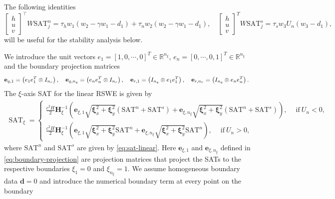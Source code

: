 \documentclass{article}
\numberwithin{equation}{section}
\theoremstyle{definition}
\begin{document}
The following identities 
$$
\begin{bmatrix}
    h\\
    u\\
    v
\end{bmatrix}^\top W\mathrm{SAT}^{n}_{j} 
= 
\tau_h w_1 \left(w_2 - \gamma w_1- d_1\right) +
     \tau_n w_2\left(w_2 - \gamma w_1- d_1\right),
     \quad
\begin{bmatrix}
    h\\
    u\\
    v
\end{bmatrix}^T W\mathrm{SAT}^{s}_{j} 
= 
\tau_s w_3 U_n \left(w_3- d_1\right) ,
$$
will be useful for the stability analysis below. 

We introduce the unit vectors
$e_1 = [1, 0, \cdots, 0]^T\in \mathbb{R}^{n_\xi}$, $e_{n} = [0,  \cdots, 0, 1]^T\in \mathbb{R}^{n_\xi}$
and the boundary projection matrices
\begin{align}\label{eq:boundary-projection}
\centering
&\mathbf{e}_{q, 1} = \left( e_1 e_1^T \otimes I_{n_r}\right), \quad \mathbf{e}_{q, n_q} = \left( e_n e_n^T \otimes I_{n_r}\right), \quad \mathbf{e}_{r, 1} = \left(I_{n_q} \otimes  e_1 e_1^T\right), \quad
\mathbf{e}_{r, n_r} = \left(I_{n_q} \otimes  e_n e_n^T\right).
\end{align}
The $\xi$-axis SAT for the linear RSWE is given by
{\footnotesize
\begin{eqnarray}\label{eq:sat-axis-linear}
\operatorname{SAT}_\xi=
 \begin{cases}
    \frac{c^2H}{2}\bm{H}_{\xi}^{-1}\left(\mathbf{e}_{\xi, 1}\sqrt{\bm{\xi}_x^2 + \bm{\xi}_y^2}\left(\mathrm{SAT}^{n} + \mathrm{SAT}^{s}\right) + \mathbf{e}_{\xi, n_\xi}\sqrt{\bm{\xi}_x^2 + \bm{\xi}_y^2}\left(\mathrm{SAT}^{n} + \mathrm{SAT}^{s}\right)\right), \quad \ \text{if} \ U_n < 0, \\
   \frac{c^2H}{2}\bm{H}_{\xi}^{-1}\left(\mathbf{e}_{\xi,1}\sqrt{\bm{\xi}_x^2 + \bm{\xi}_y^2}\mathrm{SAT}^{n} + \mathbf{e}_{\xi,n_\xi}\sqrt{\bm{\xi}_x^2 + \bm{\xi}_y^2}\mathrm{SAT}^{n}\right), \quad \ \text{if} \ U_n > 0,
    \end{cases}
\end{eqnarray}
}
where $\mathrm{SAT}^{n}$ and $\mathrm{SAT}^{s}$ are given by \eqref{eq:sat-linear}.
Here $\mathbf{e}_{\xi,1}$ and  $\mathbf{e}_{\xi,n_\xi}$ defined in \eqref{eq:boundary-projection} are projection matrices that project the SATs to the respective boundaries $\xi_1 =0$ and $\xi_{n_\xi} = 1$. We assume homogeneous boundary data $\bm{d}=0$ and introduce the numerical boundary term at every point on the boundary
\end{document}
